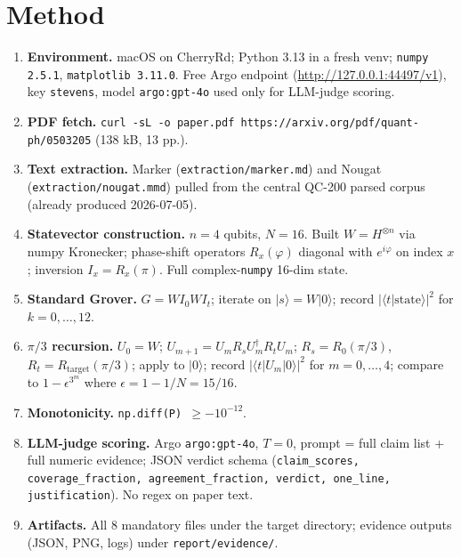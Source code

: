 \documentclass[11pt]{article}
\begin{document}
\section{Method}
\begin{enumerate}
  \item \textbf{Environment.} macOS on CherryRd; Python 3.13 in a fresh venv;
        \texttt{numpy 2.5.1}, \texttt{matplotlib 3.11.0}. Free Argo endpoint
        (\url{http://127.0.0.1:44497/v1}), key \texttt{stevens}, model
        \texttt{argo:gpt-4o} used only for LLM-judge scoring.
  \item \textbf{PDF fetch.} \texttt{curl -sL -o paper.pdf https://arxiv.org/pdf/quant-ph/0503205} (138 kB, 13 pp.).
  \item \textbf{Text extraction.} Marker (\texttt{extraction/marker.md}) and
        Nougat (\texttt{extraction/nougat.mmd}) pulled from the central QC-200
        parsed corpus (already produced 2026-07-05).
  \item \textbf{Statevector construction.} $n = 4$ qubits, $N = 16$. Built
        $W = H^{\otimes n}$ via numpy Kronecker; phase-shift operators
        $R_x(\varphi)$ diagonal with $e^{i\varphi}$ on index $x$; inversion
        $I_x = R_x(\pi)$. Full complex-\texttt{numpy} 16-dim state.
  \item \textbf{Standard Grover.} $G = W I_0 W I_t$; iterate on
        $|s\rangle = W|0\rangle$; record $|\langle t | \text{state}\rangle|^2$
        for $k = 0, \dots, 12$.
  \item \textbf{$\pi/3$ recursion.} $U_0 = W$;
        $U_{m+1} = U_m R_s U_m^\dagger R_t U_m$;
        $R_s = R_0(\pi/3)$, $R_t = R_{\text{target}}(\pi/3)$; apply to
        $|0\rangle$; record $|\langle t|U_m|0\rangle|^2$ for $m = 0, \dots, 4$;
        compare to $1 - \epsilon^{3^m}$ where $\epsilon = 1 - 1/N = 15/16$.
  \item \textbf{Monotonicity.} \texttt{np.diff(P) $\geq -10^{-12}$}.
  \item \textbf{LLM-judge scoring.} Argo \texttt{argo:gpt-4o}, $T = 0$,
        prompt = full claim list + full numeric evidence; JSON verdict schema
        (\texttt{claim\_scores, coverage\_fraction, agreement\_fraction,
        verdict, one\_line, justification}). No regex on paper text.
  \item \textbf{Artifacts.} All 8 mandatory files under the target directory;
        evidence outputs (JSON, PNG, logs) under \texttt{report/evidence/}.
\end{enumerate}
\end{document}
